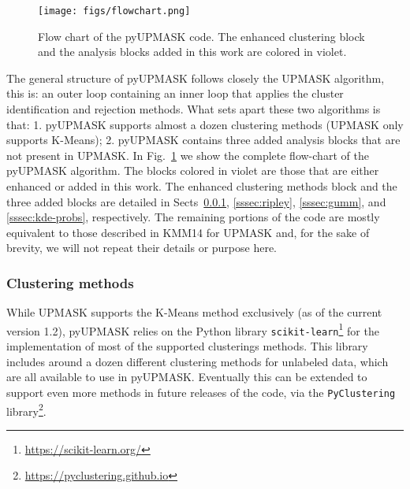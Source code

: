 \documentclass{aa}
\begin{document}
  \begin{figure}
   \centering
   \texttt{[image: figs/flowchart.png]}
   \caption{Flow chart of the pyUPMASK code. The enhanced clustering block and
   the analysis blocks added in this work are colored in violet.}
   \label{fig:flowchart}
  \end{figure}

  The general structure of pyUPMASK follows closely the UPMASK algorithm, this
  is: an outer loop containing an inner loop that applies the cluster
  identification and rejection methods. What sets apart these two algorithms
  is that: 1. pyUPMASK supports almost a dozen clustering
  methods (UPMASK only supports K-Means); 2. pyUPMASK contains
  three added analysis blocks that are not present in UPMASK.
  In Fig.~\ref{fig:flowchart} we show the complete flow-chart of the pyUPMASK
  algorithm. The blocks colored in violet are those that are either enhanced or
  added in this work.
  The enhanced clustering methods block and the three added blocks are detailed
  in Sects~\ref{sssec:clustering}, \ref{sssec:ripley},
  \ref{sssec:gumm}, and \ref{sssec:kde-probs}, respectively. The remaining
  portions of the code are mostly equivalent to those described in KMM14 for
  UPMASK and, for the sake of brevity, we will not repeat their details or
  purpose here.

 

\subsubsection{Clustering methods}
 \label{sssec:clustering}

 While UPMASK supports the K-Means method exclusively (as of the current
 version 1.2), pyUPMASK relies on the Python library
 \texttt{scikit-learn}\footnote{\url{https://scikit-learn.org/}}
 \citep{scikit-learn} for the implementation of most of the supported
 clusterings methods. This library includes around a dozen different
 clustering methods for unlabeled data, which are all available to use in
 pyUPMASK. Eventually this can be extended to support even more methods
 in future releases of the code, via the \texttt{PyClustering}
 library\footnote{\url{https://pyclustering.github.io}}.\\
\end{document}
